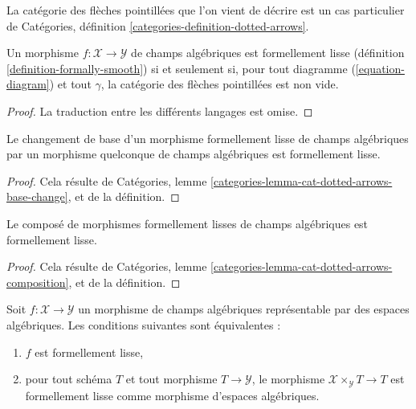 \medskip\noindent
La catégorie des flèches pointillées que l'on vient de décrire est un cas particulier de
Catégories, définition \ref{categories-definition-dotted-arrows}.

\begin{lemma}
\label{lemma-reformulate-formal-smoothness}
Un morphisme $f : \mathcal{X} \to \mathcal{Y}$ de champs algébriques est
formellement lisse (définition \ref{definition-formally-smooth})
si et seulement si, pour tout diagramme (\ref{equation-diagram}) et tout $\gamma$,
la catégorie des flèches pointillées est non vide.
\end{lemma}

\begin{proof}
La traduction entre les différents langages est omise.
\end{proof}

\begin{lemma}
\label{lemma-base-change-formal-smoothness}
Le changement de base d'un morphisme formellement lisse de champs algébriques
par un morphisme quelconque de champs algébriques est formellement lisse.
\end{lemma}

\begin{proof}
Cela résulte de
Catégories, lemme \ref{categories-lemma-cat-dotted-arrows-base-change},
et de la définition.
\end{proof}

\begin{lemma}
\label{lemma-composition-formal-smoothness}
Le composé de morphismes formellement lisses de champs algébriques
est formellement lisse.
\end{lemma}

\begin{proof}
Cela résulte de
Catégories, lemme \ref{categories-lemma-cat-dotted-arrows-composition},
et de la définition.
\end{proof}

\begin{lemma}
\label{lemma-formal-smoothness-representable}
Soit $f : \mathcal{X} \to \mathcal{Y}$ un morphisme de champs algébriques
représentable par des espaces algébriques. Les conditions suivantes sont équivalentes :
\begin{enumerate}
\item $f$ est formellement lisse,
\item pour tout schéma $T$ et tout morphisme $T \to \mathcal{Y}$,
le morphisme $\mathcal{X} \times_\mathcal{Y} T \to T$
est formellement lisse comme morphisme d'espaces algébriques.
\end{enumerate}
\end{lemma}

